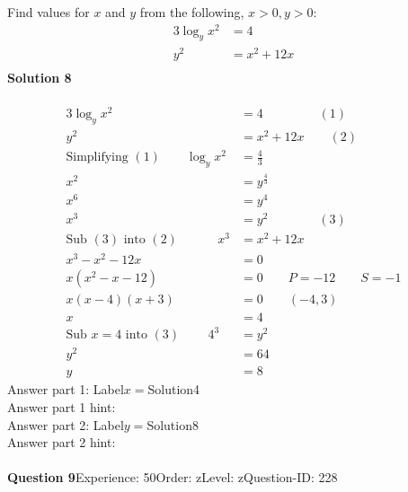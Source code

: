 \documentclass{article}
\begin{document}
Find values for $x$ and $y$ from the following, $x>0 , y>0$:
\begin{align*}
3\log_{y}x^2&=4\\[2pt]
y^2&=x^2+12x\\[-22pt]
\end{align*}
\noindent\textbf{Solution 8}\\[2pt]
\\[-35pt]\begin{align*}
3\log_{y}x^2&=4\hspace{53pt}(1)\\[2pt]
y^2&=x^2+12x\qquad (2)\\[2pt]
\text{Simplifying}\,\,(1)\qquad \log_{y}x^2&=\displaystyle\frac{4}{3}\\[2pt]
x^2&=y^{\displaystyle\frac{4}{3}}\\[2pt]
x^6&=y^4\\[2pt]
x^3&=y^2\hspace{48pt}(3)\\[2pt]
\text{Sub}\,\,(3)\,\,\text{into}\,\,(2)\hspace{38pt} x^3&=x^2+12x\\[2pt]
x^3-x^2-12x&=0\\[2pt]
x(x^2-x-12)&=0\qquad P=-12\qquad S=-1\\[2pt]
x(x-4)(x+3)&=0\qquad (-4,3)\\[2pt]
x&=4\\[12pt]
\text{Sub}\,\,x=4\,\,\text{into}\,\,(3)\hspace{27pt} 4^3&=y^2\\[2pt]
y^2&=64\\[2pt]
y&=8
\end{align*}
Answer part 1: \hspace{10pt}Label\hspace{10pt}$x=$\hspace{10pt}Solution\hspace{10pt}4\\
Answer part 1 hint: \hspace{15pt}\\
Answer part 2: \hspace{10pt}Label\hspace{10pt}$y=$\hspace{10pt}Solution\hspace{10pt}8\\
Answer part 2 hint: \hspace{15pt}\\
\\[4pt]
\noindent\textbf{Question 9}\hspace{20pt}Experience: 50\hspace{20pt}Order: z\hspace{20pt}Level: z\hspace{20pt}Question-ID: 228\\[2pt]
\end{document}
